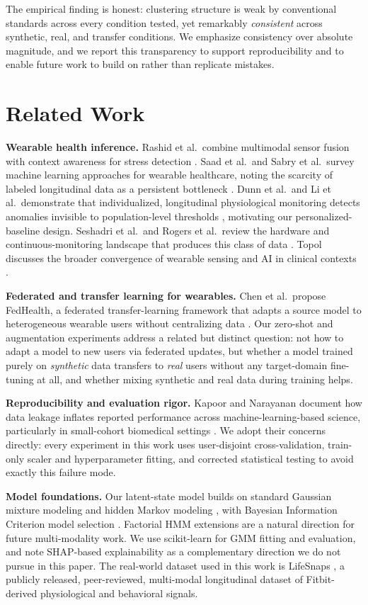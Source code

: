 \documentclass[conference]{IEEEtran}
\begin{document}
The empirical finding is honest: clustering structure is weak by conventional standards \cite{b21} across every condition tested, yet remarkably \emph{consistent} across synthetic, real, and transfer conditions. We emphasize consistency over absolute magnitude, and we report this transparency to support reproducibility and to enable future work to build on rather than replicate mistakes.

\section{Related Work}

\textbf{Wearable health inference.} Rashid et al.\ combine multimodal sensor fusion with context awareness for stress detection \cite{b1}. Saad et al.\ and Sabry et al.\ survey machine learning approaches for wearable healthcare, noting the scarcity of labeled longitudinal data as a persistent bottleneck \cite{b3,b4}. Dunn et al.\ and Li et al.\ demonstrate that individualized, longitudinal physiological monitoring detects anomalies invisible to population-level thresholds \cite{b5,b8}, motivating our personalized-baseline design. Seshadri et al.\ and Rogers et al.\ review the hardware and continuous-monitoring landscape that produces this class of data \cite{b6,b10}. Topol discusses the broader convergence of wearable sensing and AI in clinical contexts \cite{b7}.

\textbf{Federated and transfer learning for wearables.} Chen et al.\ propose FedHealth, a federated transfer-learning framework that adapts a source model to heterogeneous wearable users without centralizing data \cite{b2}. Our zero-shot and augmentation experiments address a related but distinct question: not how to adapt a model to new users via federated updates, but whether a model trained purely on \emph{synthetic} data transfers to \emph{real} users without any target-domain fine-tuning at all, and whether mixing synthetic and real data during training helps.

\textbf{Reproducibility and evaluation rigor.} Kapoor and Narayanan document how data leakage inflates reported performance across machine-learning-based science, particularly in small-cohort biomedical settings \cite{b9}. We adopt their concerns directly: every experiment in this work uses user-disjoint cross-validation, train-only scaler and hyperparameter fitting, and corrected statistical testing to avoid exactly this failure mode.

\textbf{Model foundations.} Our latent-state model builds on standard Gaussian mixture modeling \cite{b16} and hidden Markov modeling \cite{b14}, with Bayesian Information Criterion model selection \cite{b18}. Factorial HMM extensions \cite{b13} are a natural direction for future multi-modality work. We use scikit-learn \cite{b11} for GMM fitting and evaluation, and note SHAP-based explainability \cite{b12} as a complementary direction we do not pursue in this paper. The real-world dataset used in this work is LifeSnaps \cite{b15}, a publicly released, peer-reviewed, multi-modal longitudinal dataset of Fitbit-derived physiological and behavioral signals.
\end{document}
